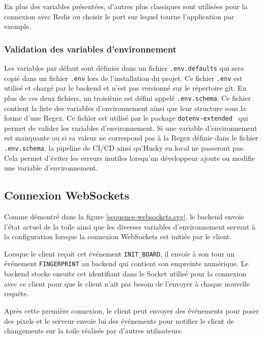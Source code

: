 En plus des variables présentées, d'autres plus classiques sont utilisées pour la connexion avec Redis ou choisir le port sur lequel tourne l'application par exemple.

\subsubsection{Validation des variables d'environnement}

Les variables par défaut sont définies dans un fichier \texttt{.env.defaults} qui sera copié dans un fichier \texttt{.env} lors de l'installation du projet. Ce fichier \texttt{.env} est utilisé et chargé par le backend et n'est pas versionné sur le répertoire git. En plus de ces deux fichiers, un troisième est défini appelé \texttt{.env.schema}. Ce fichier contient la liste des variables d'environnement ainsi que leur structure sous la forme d'une Regex. Ce fichier est utilisé par le package \texttt{dotenv-extended}~\cite{dotenv-extended} qui permet de valider les variables d'environnement. Si une variable d'environnement est manquante ou si sa valeur ne correspond pas à la Regex définie dans le fichier \texttt{.env.schema}, la pipeline de CI/CD ainsi qu'Husky en local ne passeront pas. Cela permet d'éviter les erreurs inutiles lorsqu'un développeur ajoute ou modifie une variable d'environnement.

\subsection{Connexion WebSockets}
\label{section:connexion-websockets}


Comme démontré dans la figure \ref{sequence-websockets.svg}, le backend envoie l'état actuel de la toile ainsi que les diverses variables d'environnement servant à la configuration lorsque la connexion WebSockets est initiée par le client.

Lorsque le client reçoit cet événement \texttt{INIT\_BOARD}, il envoie à son tour un événement \texttt{FINGERPRINT} au backend qui contient son empreinte numérique. Le backend stocke ensuite cet identifiant dans le Socket utilisé pour la connexion avec ce client pour que le client n'ait pas besoin de l'envoyer à chaque nouvelle requête.

Après cette première connexion, le client peut envoyer des événements pour poser des pixels et le serveur envoie lui des événements pour notifier le client de changements sur la toile réalisés par d'autres utilisateurs.

